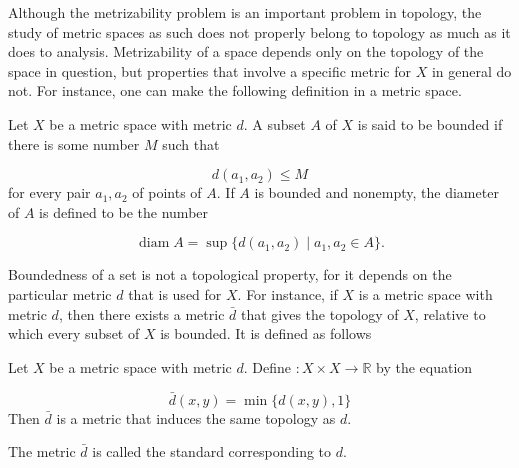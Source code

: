 Although the metrizability problem is an important problem in topology, the study of metric spaces as such does not properly belong to topology as much as it does to analysis. Metrizability of a space depends only on the topology of the space in question, but properties that involve a specific metric for \(X\) in general do not. For instance, one can make the following definition in a metric space.

\begin{definition}
 Let \(X\) be a metric space with metric \(d\). A subset \(A\) of \(X\) is said to be bounded if there is some number \(M\) such that

 \[
 d( {a_{1},a_{2}}) \leq M
 \]
 for every pair \(a_{1},a_{2}\) of points of \(A\). If \(A\) is bounded and nonempty, the diameter of \(A\) is defined to be the number

 \[
 \operatorname{diam}A = \sup \{ {d( {a_{1},a_{2}}) \mid {a}_{1},a_{2} \in A}\}.
 \]
\end{definition}

Boundedness of a set is not a topological property, for it depends on the particular metric \(d\) that is used for \(X\). For instance, if \(X\) is a metric space with metric \(d\), then there exists a metric \(\bar{d}\) that gives the topology of \(X\), relative to which every subset of \(X\) is bounded. It is defined as follows

\begin{theorem}
\label{thm:\thetheorem}
 Let \(X\) be a metric space with metric \(d\). Define \( : X \times X \rightarrow \mathbb{R}\) by the equation

 \[
 \bar{d}( {x,y}) = \min \{ d( {x,y}),1\}
 \]
 Then \(\bar{d}\) is a metric that induces the same topology as \(d\).
\end{theorem}

The metric \(\bar{d}\) is called the standard corresponding to \(d\).

